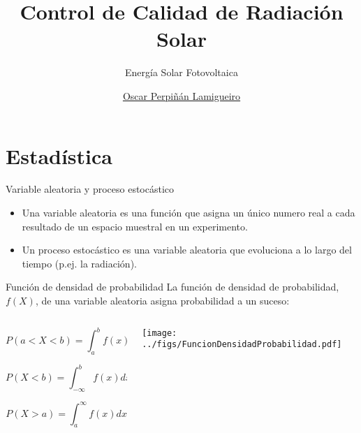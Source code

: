 \documentclass[aspectratio=169, usenames,svgnames,dvipsnames]{beamer}
\author{\href{https://oscarperpinan.github.io}{Oscar Perpiñán Lamigueiro}}
\date{}
\title{Control de Calidad de Radiación Solar}
\subtitle{Energía Solar Fotovoltaica}
\institute[UPM]{Universidad Politécnica de Madrid}
\begin{document}
\maketitle

\section{Estadística}
\label{sec:org3967edb}


\begin{frame}[label={sec:org1a6b348}]{Variable aleatoria y proceso estocástico}
\begin{itemize}
\item Una \alert{variable aleatoria} es una función que asigna un único numero
real a cada resultado de un espacio muestral en un experimento.
\item Un \alert{proceso estocástico} es una variable aleatoria que evoluciona a
lo largo del \alert{tiempo} (p.ej. la radiación).
\end{itemize}
\end{frame}


\begin{frame}[label={sec:org253ba10}]{Función de densidad de probabilidad}
La función de densidad de probabilidad, \(f(X)\), de una variable
aleatoria \alert{asigna probabilidad} a un suceso:

\begin{columns}
\begin{column}{0.5\columnwidth}

\[
P(a<X<b)=\int_{a}^{b}f(x)dx
\]


\[
P(X<b)=\int_{-\infty}^{b}f(x)dx\]


\[
P(X>a)=\int_{a}^{\infty}f(x)dx\]
\end{column}

\begin{column}{0.5\columnwidth}
\begin{center}
\texttt{[image: ../figs/FuncionDensidadProbabilidad.pdf]}
\end{center}
\end{column}
\end{columns}
\end{frame}
\end{document}
